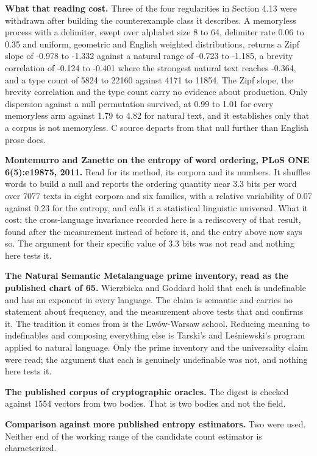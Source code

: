 \textbf{What that reading cost.} Three of the four regularities in Section 4.13 were withdrawn after building the counterexample class it describes. A memoryless process with a delimiter, swept over alphabet size 8 to 64, delimiter rate 0.06 to 0.35 and uniform, geometric and English weighted distributions, returns a Zipf slope of -0.978 to -1.332 against a natural range of -0.723 to -1.185, a brevity correlation of -0.124 to -0.401 where the strongest natural text reaches -0.364, and a type count of 5824 to 22160 against 4171 to 11854. The Zipf slope, the brevity correlation and the type count carry no evidence about production. Only dispersion against a null permutation survived, at 0.99 to 1.01 for every memoryless arm against 1.79 to 4.82 for natural text, and it establishes only that a corpus is not memoryless. C source departs from that null further than English prose does.

\textbf{Montemurro and Zanette on the entropy of word ordering, PLoS ONE 6(5):e19875, 2011.} Read for its method, its corpora and its numbers. It shuffles words to build a null and reports the ordering quantity near 3.3 bits per word over 7077 texts in eight corpora and six families, with a relative variability of 0.07 against 0.23 for the entropy, and calls it a statistical linguistic universal. What it cost: the cross-language invariance recorded here is a rediscovery of that result, found after the measurement instead of before it, and the entry above now says so. The argument for their specific value of 3.3 bits was not read and nothing here tests it.

\textbf{The Natural Semantic Metalanguage prime inventory, read as the published chart of 65.} Wierzbicka and Goddard hold that each is undefinable and has an exponent in every language. The claim is semantic and carries no statement about frequency, and the measurement above tests that and confirms it. The tradition it comes from is the Lwów-Warsaw school. Reducing meaning to indefinables and composing everything else is Tarski's and Leśniewski's program applied to natural language. Only the prime inventory and the universality claim were read; the argument that each is genuinely undefinable was not, and nothing here tests it.

\textbf{The published corpus of cryptographic oracles.} The digest is checked against 1554 vectors from two bodies. That is two bodies and not the field.

\textbf{Comparison against more published entropy estimators.} Two were used. Neither end of the working range of the candidate count estimator is characterized.

